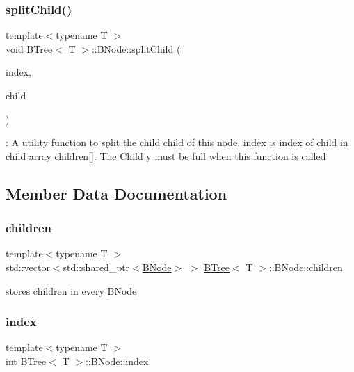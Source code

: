 \subsubsection{\texorpdfstring{split\+Child()}{splitChild()}}
{\footnotesize\ttfamily template$<$typename T $>$ \\
void \hyperlink{classBTree}{B\+Tree}$<$ T $>$\+::B\+Node\+::split\+Child (\begin{DoxyParamCaption}\item[{int}]{index,  }\item[{std\+::shared\+\_\+ptr$<$ \hyperlink{classBTree_1_1BNode}{B\+Node} $>$}]{child }\end{DoxyParamCaption})}

\+: A utility function to split the child {\ttfamily child} of this node. {\ttfamily index} is index of child in child array children\mbox{[}\mbox{]}. The Child y must be full when this function is called 

\subsection{Member Data Documentation}
\mbox{\label{classBTree_1_1BNode_a3683e8ef7010edede627bdacb9d40025}} 
\subsubsection{\texorpdfstring{children}{children}}
{\footnotesize\ttfamily template$<$typename T $>$ \\
std\+::vector$<$std\+::shared\+\_\+ptr$<$\hyperlink{classBTree_1_1BNode}{B\+Node}$>$ $>$ \hyperlink{classBTree}{B\+Tree}$<$ T $>$\+::B\+Node\+::children}

stores children in every \hyperlink{classBTree_1_1BNode}{B\+Node} \mbox{\label{classBTree_1_1BNode_a9b057ee85c9a950709afaee727515fab}} 
\subsubsection{\texorpdfstring{index}{index}}
{\footnotesize\ttfamily template$<$typename T $>$ \\
int \hyperlink{classBTree}{B\+Tree}$<$ T $>$\+::B\+Node\+::index}

